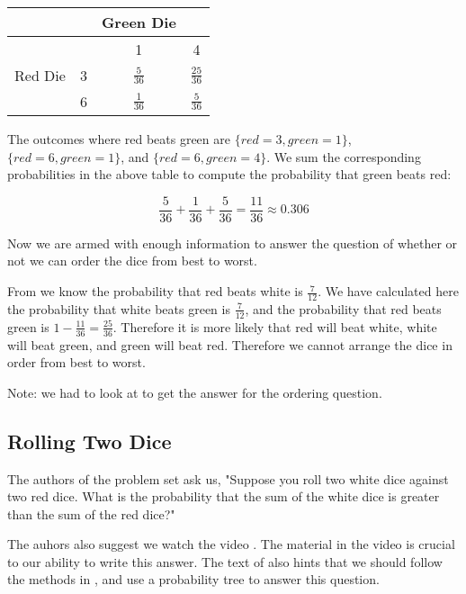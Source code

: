 \documentclass[a4paper,11pt]{article}
\begin{document}
\begin{center}
  \begin{tabular}{ | c | c | c | c| }
    \hline
     & & Green Die & \\ \hline
    & & 1 & 4 \\ \hline
    Red Die & 3 & $\frac{5}{36}$ & $\frac{25}{36}$\\ \hline
     & 6 & $\frac{1}{36}$ & $\frac{5}{36}$ \\ \hline
  \end{tabular}
\end{center}

The outcomes where red beats green are $\{red=3,green=1\}$, 
$\{red=6, green=1\}$, and $\{red=6, green=4\}$.  We sum 
the corresponding probabilities in the above table to compute
the probability that green beats red:

\begin{equation}
\frac{5}{36} + \frac{1}{36} + \frac{5}{36} = \frac{11}{36}
\approx 0.306
\end{equation}

Now we are armed with enough information to answer the question 
of whether or not we can order the dice from best to worst.

From \cite{classSlides2} we know the probability that red beats
white is $\frac{7}{12}$.  We have calculated here the probability that
white beats green is $\frac{7}{12}$, and the probability that red
beats green is $1-\frac{11}{36}=\frac{25}{36}$.  Therefore it is more
likely that red will beat white, white will beat green, and green will
beat red.  Therefore we cannot arrange the dice in order from best to
worst.

Note: we had to look at \cite{probSet1Solutions} to get the answer for
the ordering question.

\subsection{Rolling Two Dice}

The authors of the problem set \cite{probSet1} ask us, "Suppose you roll
two white dice against two red dice. What is the probability that the
sum of the white dice is greater than the sum of the red dice?"

The auhors also suggest we watch the video \cite{youTubeDice}. The 
material in the video is crucial to our ability to write this
answer.  The text of \cite{probSet1} also hints that we should
follow the methods in \cite{probSet1}, and use a probability tree
to answer this question.
\end{document}
